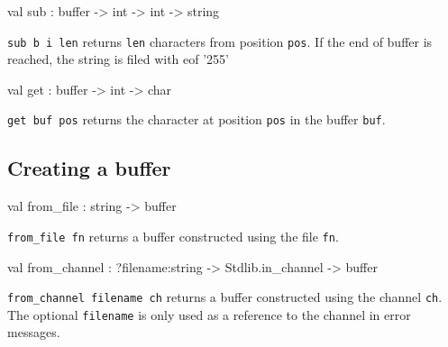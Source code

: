 \documentclass[11pt]{article}
\begin{document}
\label{val:Input.sub}\begin{ocamldoccode}
val sub : buffer -> int -> int -> string
\end{ocamldoccode}
\begin{ocamldocdescription}
{\tt{sub b i len}} returns {\tt{len}} characters from position {\tt{pos}}. If the
    end of buffer is reached, the string is filed with eof '{}255'


\end{ocamldocdescription}




\label{val:Input.get}\begin{ocamldoccode}
val get : buffer -> int -> char
\end{ocamldoccode}
\begin{ocamldocdescription}
{\tt{get buf pos}} returns the character at position {\tt{pos}} in the  buffer
    {\tt{buf}}.


\end{ocamldocdescription}




\subsection{Creating a buffer}




\label{val:Input.from-underscorefile}\begin{ocamldoccode}
val from_file : string -> buffer
\end{ocamldoccode}
\begin{ocamldocdescription}
{\tt{from\_file fn}} returns a buffer constructed using the file {\tt{fn}}.


\end{ocamldocdescription}




\label{val:Input.from-underscorechannel}\begin{ocamldoccode}
val from_channel : ?filename:string -> Stdlib.in_channel -> buffer
\end{ocamldoccode}
\begin{ocamldocdescription}
{\tt{from\_channel {}filename ch}} returns a buffer constructed  using  the
    channel {\tt{ch}}. The optional {\tt{filename}} is only used as a reference to
    the channel in error messages.


\end{ocamldocdescription}
\end{document}
